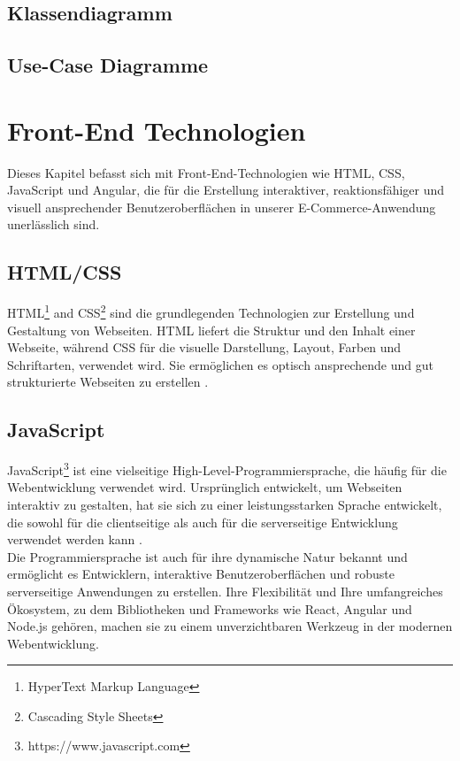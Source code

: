 \subsection{Klassendiagramm}

\subsection{Use-Case Diagramme}


\section{Front-End Technologien}

Dieses Kapitel befasst sich mit Front-End-Technologien wie HTML, CSS, JavaScript und Angular, die für die Erstellung interaktiver, reaktionsfähiger und visuell ansprechender Benutzeroberflächen in unserer E-Commerce-Anwendung unerlässlich sind.

\subsection{HTML/CSS}

HTML\footnote{HyperText Markup Language} and CSS\footnote{Cascading Style Sheets} sind die grundlegenden Technologien zur Erstellung und Gestaltung von Webseiten. HTML liefert die Struktur und den Inhalt einer Webseite, während CSS für die visuelle Darstellung, Layout, Farben und Schriftarten, verwendet wird. Sie ermöglichen es optisch ansprechende und gut strukturierte Webseiten zu erstellen \cite{HTML/CSS:2024}.

\subsection{JavaScript}

JavaScript\footnote{https://www.javascript.com} ist eine vielseitige High-Level-Programmiersprache, die häufig für die Webentwicklung verwendet wird. Ursprünglich entwickelt, um Webseiten interaktiv zu gestalten, hat sie sich zu einer leistungsstarken Sprache entwickelt, die sowohl für die clientseitige als auch für die serverseitige Entwicklung verwendet werden kann \cite{JavaScript:2024}.\\
Die Programmiersprache ist auch für ihre dynamische Natur bekannt und ermöglicht es Entwicklern, interaktive Benutzeroberflächen und robuste serverseitige Anwendungen zu erstellen. Ihre Flexibilität und Ihre umfangreiches Ökosystem, zu dem Bibliotheken und Frameworks wie React, Angular und Node.js gehören, machen sie zu einem unverzichtbaren Werkzeug in der modernen Webentwicklung. 

